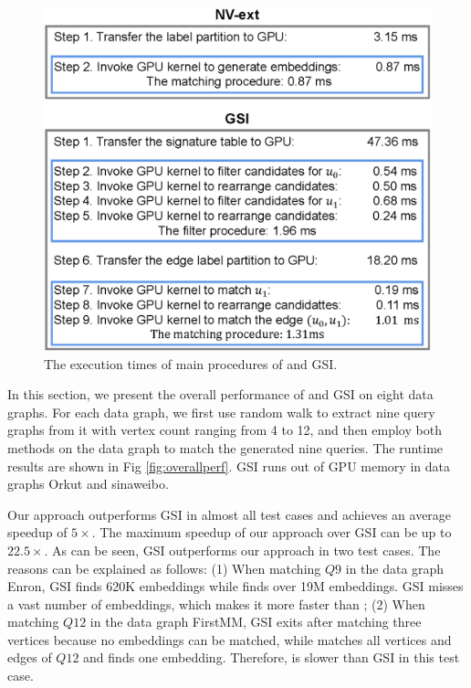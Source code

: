 \begin{figure}
\centering
\includegraphics[width=\columnwidth]{./figure/comparegsi.eps}
\caption{The execution times of main procedures of \SystemName and GSI.}	
\label{fig:compdvgsi}
\end{figure}
In this section, we present the overall performance of \SystemName and GSI on eight data graphs. For each data graph, we first use random walk to extract nine query graphs from it with vertex count ranging from 4 to 12, and then employ both methods on the data graph to match the generated nine queries. The runtime results are shown in Fig \ref{fig:overallperf}. GSI runs out of GPU memory in data graphs Orkut and sinaweibo.

Our approach outperforms GSI in almost all test cases and achieves an average speedup of $5\times$. The maximum speedup of our approach over GSI can be up to $22.5\times$. As can be seen, GSI outperforms our approach in two test cases. The reasons can be explained as follows: (1) When matching $Q9$ in the data graph Enron, GSI finds 620K embeddings while \SystemName finds over 19M embeddings. GSI misses a vast number of embeddings, which makes it more faster than \SystemName; (2) When matching $Q12$ in the data graph FirstMM, GSI exits after matching three vertices because no embeddings can be matched, while \SystemName matches all vertices and edges of $Q12$ and finds one embedding. Therefore, \SystemName is slower than GSI in this test case.

